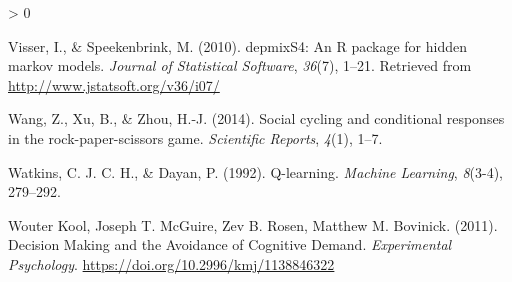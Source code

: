 \documentclass[
  english,
  man,floatsintext]{apa6}
\newlength{\cslhangindent}
\newenvironment{CSLReferences}[2] %
 {%
  \setlength{\parindent}{0pt}
  \ifodd #1 \everypar{\setlength{\hangindent}{\cslhangindent}}\ignorespaces\fi
  \ifnum #2 > 0
  \setlength{\parskip}{#2\baselineskip}
  \fi
 }%
 {}
\begin{document}
\begin{CSLReferences}{1}{0}
\leavevmode\hypertarget{ref-R-depmixS4}{}%
Visser, I., \& Speekenbrink, M. (2010). {depmixS4}: An {R} package for hidden markov models. \emph{Journal of Statistical Software}, \emph{36}(7), 1--21. Retrieved from \url{http://www.jstatsoft.org/v36/i07/}

\leavevmode\hypertarget{ref-wang2014social}{}%
Wang, Z., Xu, B., \& Zhou, H.-J. (2014). Social cycling and conditional responses in the rock-paper-scissors game. \emph{Scientific Reports}, \emph{4}(1), 1--7.

\leavevmode\hypertarget{ref-watkins1992q}{}%
Watkins, C. J. C. H., \& Dayan, P. (1992). {Q-learning}. \emph{Machine Learning}, \emph{8}(3-4), 279--292.

\leavevmode\hypertarget{ref-Kool_2011}{}%
Wouter Kool, Joseph T. McGuire, Zev B. Rosen, Matthew M. Bovinick. (2011). {Decision Making and the Avoidance of Cognitive Demand}. \emph{Experimental Psychology}. \url{https://doi.org/10.2996/kmj/1138846322}

\end{CSLReferences}

\endgroup
\end{document}

